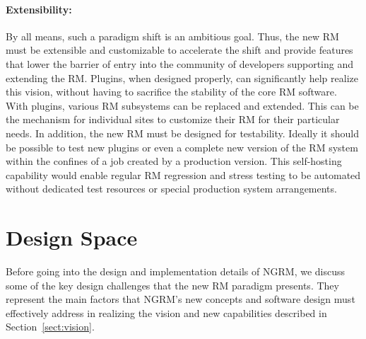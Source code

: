 \documentclass[10pt]{article}
\newcommand{\ngrm}{NGRM}
\begin{document}
\paragraph{Extensibility:}
By all means, such a paradigm shift is an ambitious goal. Thus, 
the new RM must be extensible and customizable to accelerate the shift
and provide features that lower the barrier of entry into the
community of developers supporting and extending the RM.
Plugins, when designed properly, can significantly help realize this vision,
without having to sacrifice the stability of the core RM software. 
With plugins, various RM subsystems can be replaced and extended.  
This can be the mechanism for individual
sites to customize their RM for their particular needs. 
In addition, the new RM must be designed for testability.
Ideally it should be possible to test new plugins or even a complete
new version of the RM system within the confines of a job created by
a production version.  This self-hosting capability would enable regular
RM regression and stress testing to be automated without dedicated test
resources or special production system arrangements.

%

\section{Design Space}
\label{sect:designspace}

Before going into the design and implementation details of \ngrm, we discuss 
some of the key design challenges that the new RM paradigm presents. 
They represent the main factors that \ngrm's new concepts and software design
must effectively address in realizing the vision and new capabilities described in 
Section~\ref{sect:vision}. 
\end{document}
